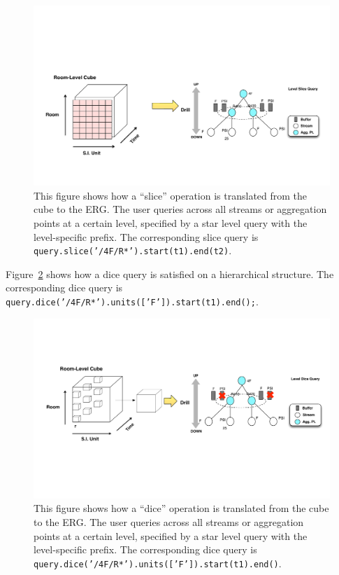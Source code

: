 \begin{figure}[h!] %
\centering
\includegraphics[width=1.0\columnwidth]{figs/olapslice2ergslice}
\caption{This figure shows how a ``slice'' operation is translated from the cube to the ERG.  The user queries across all streams or aggregation
points at a certain level, specified by a star level query with the level-specific prefix.  The corresponding slice query is
\texttt{query.slice('/4F/R*').start(t1).end(t2)}.
}
\label{fig:olapslice2ergslice}
\end{figure}



Figure~\ref{fig:olapdice2ergdice}
shows how a dice query is satisfied on a hierarchical structure.  The corresponding dice query 
is \texttt{query.dice('/4F/R*').units(['F']).start(t1).end();}.


\begin{figure}[h!] %
\centering
\includegraphics[width=1.0\columnwidth]{figs/olapdice2ergdice}
\caption{This figure shows how a ``dice'' operation is translated from the cube to the ERG.  The user queries across all streams or aggregation
points at a certain level, specified by a star level query with the level-specific prefix.  The corresponding dice query is
\texttt{query.dice('/4F/R*').units(['F']).start(t1).end()}.}
\label{fig:olapdice2ergdice}
\end{figure}


